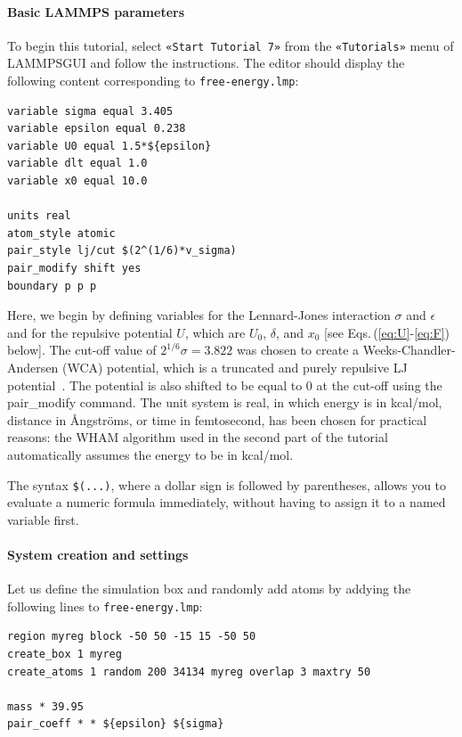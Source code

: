 \documentclass[9pt,tutorial]{livecoms}
\newcommand{\lmpcmd}[1]{\hspace{0pt}\colorbox{listing}{\textcolor{command}{\small{#1}}}\hspace{0pt}} %
\newcommand{\flecmd}[1]{\textcolor{command}{\texttt{#1}}} %
\newcommand{\guicmd}[1]{\textcolor{command}{\texttt{«#1»}}} %
\newcommand{\lammpsgui}{\textsf{LAMMPS\textendash GUI}}
\begin{document}
\paragraph{Basic LAMMPS parameters}

To begin this tutorial, select \guicmd{Start Tutorial 7} from the
\guicmd{Tutorials} menu of \lammpsgui{} and follow the instructions.
The editor should display the following content corresponding to \flecmd{free-energy.lmp}:
\begin{lstlisting}
variable sigma equal 3.405
variable epsilon equal 0.238
variable U0 equal 1.5*${epsilon}
variable dlt equal 1.0
variable x0 equal 10.0

units real
atom_style atomic
pair_style lj/cut $(2^(1/6)*v_sigma)
pair_modify shift yes
boundary p p p
\end{lstlisting}
Here, we begin by defining variables for the Lennard-Jones interaction
$\sigma$ and $\epsilon$ and for the repulsive potential
$U$, which are $U_0$, $\delta$, and
$x_0$ [see Eqs.\,(\ref{eq:U}-\ref{eq:F}) below].  {\color{blue}The cut-off value of
$ 2^{1/6} \sigma = 3.822$ was chosen to create a Weeks-Chandler-Andersen (WCA) potential,
which is a truncated and purely repulsive LJ potential~\cite{weeks1971role}.}
The potential is also shifted to be equal to 0 at the cut-off
using the \lmpcmd{pair\_modify} command.  The unit system is
\lmpcmd{real}, in which energy is in kcal/mol, distance in Ångströms, or
time in femtosecond, has been chosen for practical reasons: the WHAM
algorithm used in the second part of the tutorial automatically assumes
the energy to be in kcal/mol.

\begin{note}
  {\color{blue}The syntax \texttt{\$(...)}, where a dollar sign is followed by parentheses, allows
  you to evaluate a numeric formula immediately, without having to assign it
  to a named variable first.}
\end{note}

\paragraph{System creation and settings}

Let us define the simulation box and randomly add atoms by addying the
following lines to \flecmd{free-energy.lmp}:
\begin{lstlisting}
region myreg block -50 50 -15 15 -50 50
create_box 1 myreg
create_atoms 1 random 200 34134 myreg overlap 3 maxtry 50

mass * 39.95
pair_coeff * * ${epsilon} ${sigma}
\end{lstlisting}
\end{document}
